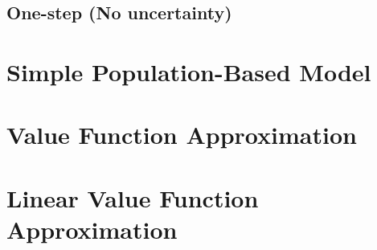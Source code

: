 \documentclass{article}
\theoremstyle{remark}
\theoremstyle{remark}
\theoremstyle{remark}
\theoremstyle{remark}
\theoremstyle{remark}
\theoremstyle{remark}
\begin{document}
\subsection{One-step (No uncertainty)}

\section{Simple Population-Based Model}


\section{Value Function Approximation}

\section{Linear Value Function Approximation}





\end{document}

